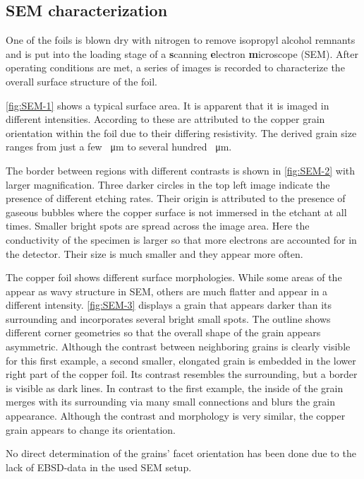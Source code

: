 	\subsection{SEM characterization} 
	One of the foils is blown dry with nitrogen to remove isopropyl alcohol remnants and is put into the loading stage of a \textbf{s}canning \textbf{e}lectron \textbf{m}icroscope (SEM). After operating conditions are met, a series of images is recorded to characterize the overall surface structure of the foil. 
	
\autoref{fig:SEM-1} shows a typical surface area. It is apparent that it is imaged in different intensities. According to \cite{wu_effects_2015, wendt_correlation_2007, langlois_crystal_2015} these are attributed to the copper grain orientation within the foil due to their differing resistivity. The derived grain size ranges from just a few \SI{}{\micro \meter} to several hundred \SI{}{\micro \meter}. 
	
The border between regions with different contrasts is shown in \autoref{fig:SEM-2} with larger magnification. Three darker circles in the top left image indicate the presence of different etching rates. Their origin is attributed to the presence of gaseous bubbles where the copper surface is not immersed in the etchant at all times. Smaller bright spots are spread across the image area. Here the conductivity of the specimen is larger so that more electrons are accounted for in the detector. Their size is much smaller and they appear more often.

The copper foil shows different surface morphologies. While some areas of the appear as  wavy structure in SEM, others are much flatter and appear in a different intensity. \autoref{fig:SEM-3} displays a grain that appears darker than its surrounding and  incorporates several bright small spots. The outline shows different corner geometries so that the overall shape of the grain appears asymmetric. Although the contrast between neighboring grains is clearly visible for this first example, a second smaller, elongated grain is embedded in the lower right part of the copper foil. Its contrast resembles the surrounding, but a border is visible as dark lines. In contrast to the first example, the inside of the grain merges with its surrounding via many small connections and blurs the grain appearance. Although the contrast and morphology is very similar, the copper grain appears to change its orientation.
	
No direct determination of the grains' facet orientation has been done due to the lack of EBSD-data in the used SEM setup.
	
